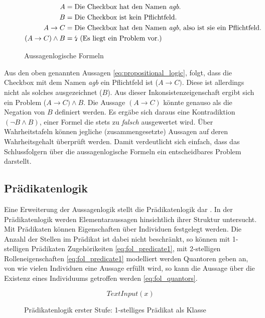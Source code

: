 \documentclass[runningheads,a4paper]{llncs}
\begin{document}
\begin{figure}
\begin{align}
\begin{split}
A &= \textnormal{Die Checkbox hat den Namen \textit{agb}.}\\
B &= \textnormal{Die Checkbox ist kein Pflichtfeld.}\\
A \to C &= \textnormal{Die Checkbox hat den Namen \textit{agb}, also ist sie ein Pflichtfeld.}\\
(A \to C) \land B &= \textnormal{\lightning\ (Es liegt ein Problem vor.)}
\label{eq:propositional_logic}
\end{split}
\end{align}
\caption{Aussagenlogische Formeln}
\end{figure}
 
Aus den oben genannten Aussagen \eqref{eq:propositional_logic}, folgt, dass die Checkbox mit dem Namen \textit{agb} ein Pflichtfeld ist (\(A \to C)\). 
Diese ist allerdings nicht als solches ausgezeichnet (\(B\)). 
Aus dieser Inkonsistenzeigenschaft ergibt sich ein Problem (\(A \to C) \land B\). 
Die Aussage \((A \to C)\) könnte genauso als die Negation von \(B\) definiert werden. 
Es ergäbe sich daraus eine Kontradiktion \((\neg B \land B)\), einer Formel die stets zu \textit{falsch} ausgewertet wird. 
Über Wahrheitstafeln können jegliche (zusammengesetzte) Aussagen auf deren Wahrheitsgehalt überprüft werden. 
Damit verdeutlicht sich einfach, dass das Schlussfolgern über die aussagenlogische Formeln ein entscheidbares Problem darstellt.
\\

\subsection{Prädikatenlogik}
\label{sec:prediactelogic}

Eine Erweiterung der Aussagenlogik stellt die Prädikatenlogik dar \cite[p. 6,367--373]{foundations}.
In der Prädikatenlogik werden Elementaraussagen hinsichtlich ihrer Struktur untersucht.
Mit Prädikaten können Eigenschaften über Individuen festgelegt werden. 
Die Anzahl der Stellen im Prädikat ist dabei nicht beschränkt, so können mit 1-stelligen Prädikaten Zugehörikeiten \eqref{eq:fol_predicate1}, mit 2-stelligen Rolleneigenschaften \eqref{eq:fol_predicate1} modelliert werden  
Quantoren geben an, von wie vielen Individuen eine Aussage erfüllt wird, so kann die Aussage über die Existenz eines Individuums getroffen werden \eqref{eq:fol_quantors}.
\begin{figure}
\begin{equation}
TextInput(x)
\label{eq:fol_predicate1}
\end{equation}
\caption{Prädikatenlogik erster Stufe: 1-stelliges Prädikat als Klasse}
\end{figure}
\end{document}
